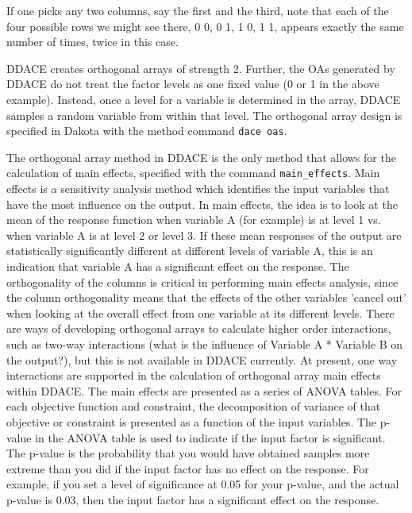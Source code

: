 If one picks any two columns, say the first and the third, note that 
each of the four possible rows we might see there,
0 0,       0 1,       1 0,       1 1,
appears exactly the same number of times, twice in this case.

DDACE creates orthogonal arrays of strength 2. Further, 
the OAs generated by DDACE do not treat the factor levels as one 
fixed value (0 or 1 in the above example). Instead, once a level 
for a variable is determined in the array,  DDACE 
samples a random variable from within that level.
The orthogonal array design is specified in 
Dakota with the method command \texttt{dace oas}. 

The orthogonal array method in DDACE is the only method that 
allows for the calculation of main effects, specified with the 
command \texttt{main\_effects}. Main effects is a sensitivity analysis 
method which identifies the input variables that have the most 
influence on the output. In main effects, the idea is to look 
at the mean of the response function when variable A (for example) 
is at level 1 vs. when variable A is at level 2 or level 3. 
If these mean responses of the output are statistically significantly 
different at different levels of variable A, this is an indication that 
variable A has a significant effect on the response. 
The orthogonality of the columns is critical in performing 
main effects analysis, since the column orthogonality means 
that the effects of the other variables 'cancel out' when 
looking at the overall effect from one variable at its different 
levels. There are ways of developing orthogonal arrays to calculate 
higher order interactions, such as two-way interactions (what 
is the influence of Variable A * Variable B on the output?), but this is 
not available in DDACE currently. At present, one way interactions 
are supported in the calculation of orthogonal array main effects within DDACE.
The main effects are presented as a series of ANOVA tables. 
For each objective function and constraint, the decomposition of variance 
of that objective or constraint is presented as a function of the 
input variables. The p-value in the ANOVA table is used to indicate 
if the input factor is significant. The p-value is the probability that 
you would have obtained samples more extreme than you did if the input 
factor has no effect on the response. For example, if you set a level 
of significance at 0.05 for your p-value, and the actual p-value is 0.03, 
then the input factor has a significant effect on the response. 

